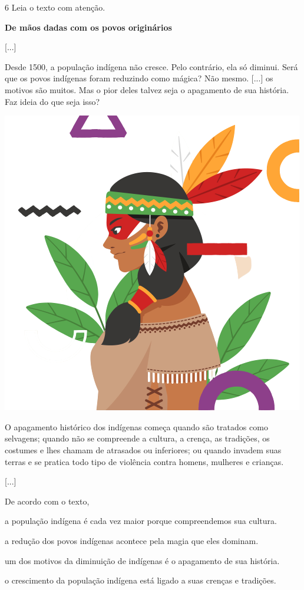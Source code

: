 \num{6} Leia o texto com atenção.

\begin{myquote}
\textbf{De mãos dadas com os povos originários}

{[}...{]}

Desde 1500, a população indígena não cresce. Pelo contrário, ela só
diminui. Será que os povos indígenas foram reduzindo como mágica? Não
mesmo. {[}...{]} os motivos são muitos. Mas o pior deles talvez seja o
apagamento de sua história. Faz ideia do que seja isso?

\begin{center}
\includegraphics[width=.5\textwidth]{./media/image23h.png}
\end{center}


O apagamento histórico dos indígenas começa quando são tratados como
selvagens; quando não se compreende a cultura, a crença, as tradições,
os costumes e lhes chamam de atrasados ou inferiores; ou quando invadem
suas terras e se pratica todo tipo de violência contra homens, mulheres
e crianças.

{[}...{]}

\end{myquote}

De acordo com o texto,

\begin{escolha}
\item a população indígena é cada vez maior porque compreendemos sua cultura.

\item a redução dos povos indígenas acontece pela magia que eles dominam.

\item um dos motivos da diminuição de indígenas é o apagamento de sua história.

\item o crescimento da população indígena está ligado a suas crenças e tradições.
\end{escolha}


